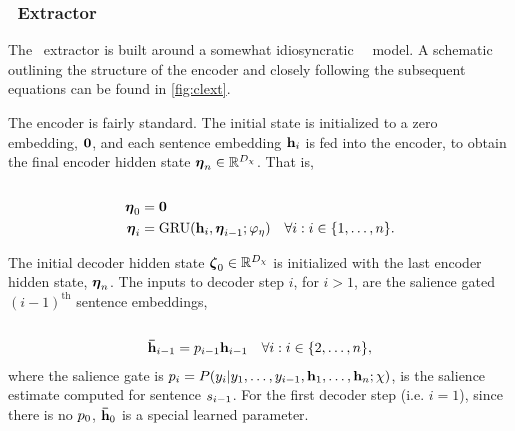 

\subsubsection{\clext~Extractor}

The \clext~extractor \citep{cheng2016neural} is built around a somewhat
idiosyncratic \unidirectional~\sequencetosequence~model. A schematic outlining
the structure of the encoder and closely following the subsequent equations can
be found in \autoref{fig:clext}.

The encoder is fairly standard. The initial state is initialized to a zero
embedding, $\mathbf{0}$, and each sentence embedding $\mathbf{h}_i$ is fed into the
encoder, to obtain the final encoder hidden state $\boldsymbol{\eta}_n \in
\mathbb{R}^{{D_{\chi}}}$. That is,\\

\\[-40pt]
\begin{align}
    \boldsymbol{\eta}_0 & = \mathbf{0} \\
    \boldsymbol{\eta}_i &= \operatorname{GRU}(\mathbf{h}_i, \boldsymbol{\eta}_{i-1};\varphi_\eta) & 
    \forall i : i \in \{1,\ldots,n\}. 
\end{align}

The initial decoder hidden state $\boldsymbol{\zeta}_0 \in \mathbb{R}^{{D_{\chi}}}$ is
initialized with the last encoder hidden state, $\boldsymbol{\eta}_n$.  The
inputs to decoder step $i$, for $i >1$, are the salience gated
$(i-1)^\textrm{th}$ sentence embeddings,\\

\\[-40pt]
\begin{align}
    \boldsymbol{\bar{\mathbf{h}}}_{i-1} & = p_{i-1}\mathbf{h}_{i-1} &
    \forall i: i \in \{2,\dots,n\},
\end{align}
where the salience gate is $p_i =
P(y_i|y_1,\ldots,y_{i-1},
\mathbf{h}_1,\ldots,\mathbf{h}_n;\chi)$, is the salience estimate
computed for sentence $s_{i-1}$.  For the first decoder step (i.e. $i=1$),
since there is no $p_0$, $\boldsymbol{\bar{\mathbf{h}}}_0$ is a special learned parameter.

